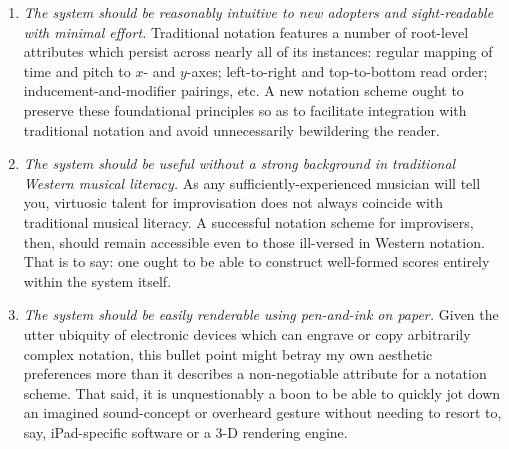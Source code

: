 \begin{enumerate}[label=(\roman*)]
        \item \textit{The system should be reasonably intuitive to new adopters and sight-readable with minimal effort.} Traditional notation features a number of root-level attributes which persist across nearly all of its instances: regular mapping of time and pitch to $x$- and $y$-axes; left-to-right and top-to-bottom read order; inducement-and-modifier pairings, etc. A new notation scheme ought to preserve these foundational principles so as to facilitate integration with traditional notation and avoid unnecessarily bewildering the reader. 
        
        
        \item \textit{The system should be useful without a strong background in traditional Western musical literacy.} As any sufficiently-experienced musician will tell you, virtuosic talent for improvisation does not always coincide with traditional musical literacy. A successful notation scheme for improvisers, then, should remain accessible even to those ill-versed in Western notation. That is to say: one ought to be able to construct well-formed scores entirely within the system itself.
        
        \item \textit{The system should be easily renderable using pen-and-ink on paper.} Given the utter ubiquity of electronic devices which can engrave or copy arbitrarily complex notation, this bullet point might betray my own aesthetic preferences more than it describes a non-negotiable attribute for a notation scheme. That said, it is unquestionably a boon to be able to quickly jot down an imagined sound-concept or overheard gesture without needing to resort to, say, iPad-specific software or a 3-D rendering engine.
        
    \end{enumerate}


